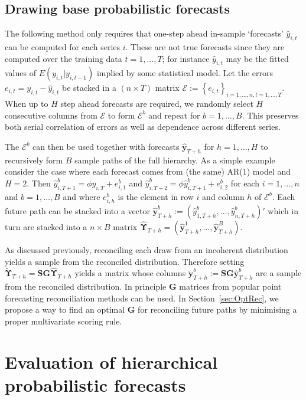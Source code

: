 \documentclass[12pt]{article}
\theoremstyle{definition}
\begin{document}
\subsection{Drawing base probabilistic forecasts}\label{sec:drawbase}

The following method only requires that one-step ahead in-sample `forecasts' $\hat{y}_{i,t}$ can be computed for each series $i$.  These are not true forecasts since they are computed over the training data $t=1,\ldots,T$; for instance  $\hat{y}_{i,t}$ may be the fitted values of $E(y_{i,t}|y_{i,t-1})$ implied by some statistical model. Let the errors $e_{i,t} = y_{i,t} - \hat{y}_{i,t}$ be stacked in a $(n \times T)$ matrix $\bm{\mathcal{E}}:=\left\{e_{i,t}\right\}_{i=1,\dots,n,t=1,\dots,T}$.  When up to $H$ step ahead forecasts are required, we randomly select $H$ consecutive columns from $\bm{\mathcal{E}}$ to form $\bm{\mathcal{E}}^b$ and repeat for $b = 1,\dots,B$.  This preserves both serial correlation of errors as well as dependence across different series.

The $\bm{\mathcal{E}}^b$ can then be used together with forecasts $\hat{\bm{y}}_{T+h}$ for $h=1,\ldots,H$ to recursively form $B$ sample paths of the full hierarchy.  As a simple example consider the case where each forecast comes from (the same) AR(1) model and $H=2$.  Then $\hat{{y}}^b_{i,T+1}=\phi{{y}}_{i,T}+e^b_{i,1}$ and $\hat{{y}}^b_{i,T+2}=\phi\hat{{y}}^b_{i,T+1}+e^b_{i,2}$ for each $i=1,\ldots,n$ and $b=1,\ldots,B$ and where $e^b_{i,h}$ is the element in row $i$ and column $h$ of $\bm{\mathcal{E}}^b$.  Each future path can be stacked into a vector $\hat{\bm{y}}^b_{T+h}:=(\hat{{y}}^b_{1,T+h},\ldots,\hat{{y}}^b_{n,T+h})'$ which in turn are stacked into a $n\times B$ matrix $\hat{\bm{\Upsilon}}_{T+h} = (\hat{\bm{y}}^1_{T+h},\dots,\hat{\bm{y}}^B_{T+h})$.

As discussed previously, reconciling each draw from an incoherent distribution yields a sample from the reconciled distribution.  Therefore setting $\tilde{\bm{\Upsilon}}_{T+h} = \bm{SG}\hat{\bm{\Upsilon}}_{T+h}$ yields a matrix whose columns $\tilde{\bm{y}}^b_{T+h} := \bm{SG}\hat{\bm{y}}^b_{T+h}$ are a sample from the reconciled distribution.  In principle $\bm{G}$ matrices from popular point forecasting reconciliation methods can be used. In Section~\ref{sec:OptRec}, we propose a way to find an optimal $\bm{G}$ for reconciling future paths by minimising a proper multivariate scoring rule.

\section{Evaluation of hierarchical probabilistic forecasts} \label{sec:evaluation}
\end{document}
